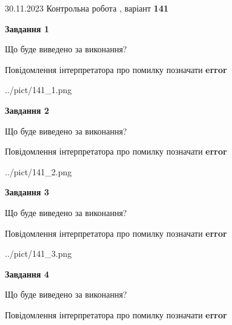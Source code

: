 \documentclass[12pt, ukrainian]{article}
\begin{document}
{{30.11.2023 Контрольна робота , варіант  \No \textbf { 141 }\par}}
{




{\begin {center}\textbf{Завдання 1}\end {center}}\par
Що буде виведено за виконання? \par
Повідомлення інтерпретатора про помилку позначати \textbf{error}

\begin{center}
	{../pict/141_1.png}
\end{center}
\newpage

{\begin {center}\textbf{Завдання 2}\end {center}}\par
Що буде виведено за виконання? \par
Повідомлення інтерпретатора про помилку позначати \textbf{error}

\begin{center}
	{../pict/141_2.png}
\end{center}
\newpage

{\begin {center}\textbf{Завдання 3}\end {center}}\par
Що буде виведено за виконання? \par
Повідомлення інтерпретатора про помилку позначати \textbf{error}

\begin{center}
	{../pict/141_3.png}
\end{center}
\newpage

{\begin {center}\textbf{Завдання 4}\end {center}}\par
Що буде виведено за виконання? \par
Повідомлення інтерпретатора про помилку позначати \textbf{error}

}
\end{document}

